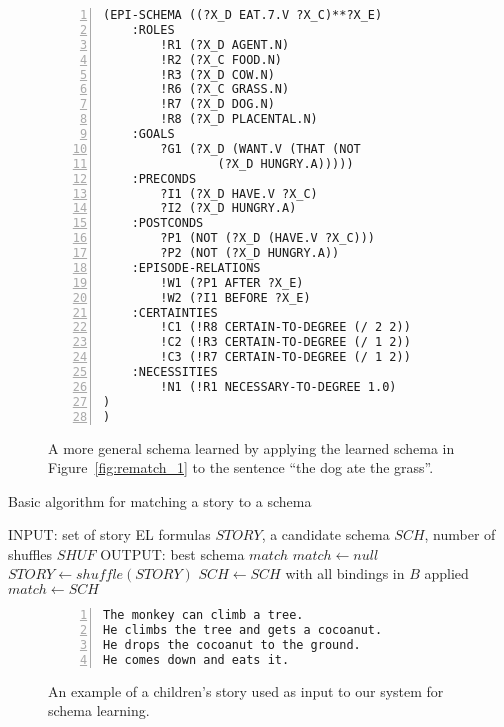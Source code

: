 \begin{figure}[htbp]
    \begin{lstlisting}[frame=single,numbers=left,numberstyle=\tiny,xleftmargin=1.5em,style=Schemas]
(EPI-SCHEMA ((?X_D EAT.7.V ?X_C)**?X_E)
	:ROLES
		!R1 (?X_D AGENT.N)
		!R2 (?X_C FOOD.N)
		!R3 (?X_D COW.N)
		!R6 (?X_C GRASS.N)
		!R7 (?X_D DOG.N)
		!R8 (?X_D PLACENTAL.N)
	:GOALS
		?G1 (?X_D (WANT.V (THAT (NOT
		        (?X_D HUNGRY.A)))))
	:PRECONDS
		?I1 (?X_D HAVE.V ?X_C)
		?I2 (?X_D HUNGRY.A)
	:POSTCONDS
		?P1 (NOT (?X_D (HAVE.V ?X_C)))
		?P2 (NOT (?X_D HUNGRY.A))
	:EPISODE-RELATIONS
		!W1 (?P1 AFTER ?X_E)
		!W2 (?I1 BEFORE ?X_E)
	:CERTAINTIES
		!C1 (!R8 CERTAIN-TO-DEGREE (/ 2 2))
		!C2 (!R3 CERTAIN-TO-DEGREE (/ 1 2))
		!C3 (!R7 CERTAIN-TO-DEGREE (/ 1 2))
	:NECESSITIES
		!N1 (!R1 NECESSARY-TO-DEGREE 1.0)
)
)\end{lstlisting}
    \caption{A more general schema learned by applying the learned schema in Figure~\ref{fig:rematch_1} to the sentence ``the dog ate the grass''.}
    \label{fig:rematch_2}
\end{figure}

\begin{algorithm}
\caption{Basic algorithm for matching a story to a schema}
\label{alg:matching}
\begin{algorithmic}
\STATE INPUT: set of story EL formulas $STORY$, a candidate schema $SCH$, number of shuffles $SHUF$
\STATE OUTPUT: best schema $match$
\STATE $match \gets null$
    \STATE $STORY \gets shuffle(STORY)$
                \STATE $SCH \gets SCH$ with all bindings in $B$ applied
            \ENDIF
        \ENDFOR
    \ENDFOR
        \STATE $match \gets SCH$
    \ENDIF
\ENDFOR
\end{algorithmic}
\end{algorithm}

\begin{figure}[htbp]
        \begin{lstlisting}[frame=single,numbers=left,numberstyle=\tiny,xleftmargin=1.5em,style=Schemas]
The monkey can climb a tree.
He climbs the tree and gets a cocoanut.
He drops the cocoanut to the ground.
He comes down and eats it.\end{lstlisting}
    \caption{An example of a children's story used as input to our system for schema learning.}
    \label{fig:story}
\end{figure}

